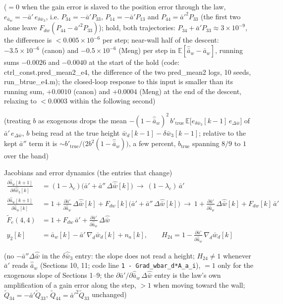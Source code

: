 \documentclass[11pt,a4paper,fontset=none]{ctexart}
\newcommand{\ba}{\bar{a}}
\newcommand{\bw}{\bar{w}}
\newcommand{\E}{\mathbb{E}}
\newcommand{\dWh}{\Delta\hat{\bw}}
\newcommand{\eD}{e_{\Delta\bw}}
\newcommand{\ap}{\ba'}
\newcommand{\app}{\ba''}
\begin{document}
($= 0$ when the gain error is slaved to the position error through the law, $e_{\ba_w} = -\ap\,e_{\delta\bw_3}$, i.e.
$P_{34} = -\ap P_{33}$, $P_{14} = -\ap P_{13}$ and $P_{44} = \ap^{2}P_{33}$ (the first two alone leave $F_{dw}(P_{44} - \ap^{2}P_{33})$);
hold, both trajectories: $P_{34} + \ap P_{33} \approx 3\times10^{-9}$, the difference is $< 0.005\times10^{-6}$ per step;
near-wall half of the descent: $-3.5\times10^{-6}$ (canon) and $-0.5\times10^{-6}$ (Meng) per step in $\E[\hat{\ba}_w - \ba_w]$,
running sums $-0.0026$ and $-0.0040$ at the start of the hold (code: ctrl\_const.pred\_mean2\_e4, the difference of the two
pred\_mean2 logs, 10 seeds, run\_btrue\_e4.m); the closed-loop response to this input is smaller than its running sum,
$+0.0010$ (canon) and $+0.0004$ (Meng) at the end of the descent, relaxing to $< 0.0003$ within the following second)

(treating $b$ as exogenous drops the mean $-(1-\hat{\ba}_w)^{2}\,b'_{\mathrm{true}}\,\E\bigl[e_{\delta\bw_3}[k-1]\,\eD\bigr]$ of $\ap\,\eD$,
$b$ being read at the true height $\bw_d[k-1] - \delta\bw_3[k-1]$; relative to the kept $\app$ term it is $\sim b'_{\mathrm{true}}/\bigl(2b^{2}(1-\hat{\ba}_w)\bigr)$,
a few percent, $b_{\mathrm{true}}$ spanning $8/9$ to $1$ over the band)

Jacobians and error dynamics (the entries that change)
\begin{align*}
\frac{\partial \hat{\ba}_w[k+1]}{\partial \delta\hat{\bw}_3[k]} &= (1-\lambda_c)\bigl(\ap + \app\,\dWh[k]\bigr) \ \to\ (1-\lambda_c)\,\ap \\
\frac{\partial \hat{\ba}_w[k+1]}{\partial \hat{\ba}_w[k]}
  &= 1 + \frac{\partial\ap}{\partial\hat{\ba}_w}\,\dWh[k] + F_{dw}[k]\bigl(\ap + \app\,\dWh[k]\bigr)
  \ \to\ 1 + \frac{\partial\ap}{\partial\hat{\ba}_w}\,\dWh[k] + F_{dw}[k]\,\ap \\
\tilde{F}_e(4,4) &= 1 + F_{dw}\,\ap + \frac{\partial\ap}{\partial\hat{\ba}_w}\,\dWh \\
y_2[k] &= \ba_w[k] - \ap\,\nabla_d\bw_d[k] + n_a[k] , \qquad
H_{24} = 1 - \frac{\partial\ap}{\partial\hat{\ba}_w}\,\nabla_d\bw_d[k]
\end{align*}

(no $-\app\dWh$ in the $\delta\hat{\bw}_3$ entry: the slope does not read a height; $H_{24} \neq 1$ whenever $\ap$ reads $\hat{\ba}_w$
(Sections 10, 11; code line \texttt{1 - Grad\_wbar\_d*A\_a\_i}), $= 1$ only for the exogenous slope of Sections 1--9;
the $\partial\ap/\partial\hat{\ba}_w\,\dWh$ entry is the law's own amplification of a gain error along the step,
$> 1$ when moving toward the wall; $\tilde{Q}_{34} = -\ap\tilde{Q}_{33}$, $\tilde{Q}_{44} = \ap^{2}\tilde{Q}_{33}$ unchanged)
\end{document}
